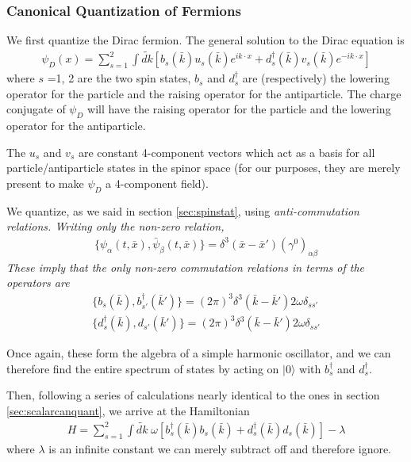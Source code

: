 \documentclass[12pt,epsf]{article}
\def\nolabel{\nonumber }
\def\nolabel{\nonumber }
\begin{document}
\subsubsection{Canonical Quantization of Fermions}

We first quantize the Dirac fermion.  The general solution to the Dirac
equation is
\begin{eqnarray}
\psi_D(x) = \sum_{s=1}^2\int \widetilde{dk} [b_s(\bar k)u_s(\bar
k)e^{ik\cdot x} + d^{\dagger}_s(\bar k)v_s(\bar k)e^{-ik\cdot
x}]\nolabel
\end{eqnarray}
where $s$ =1, 2 are the two spin states, $b_s$ and $d^{\dagger}_s$ are
(respectively) the lowering operator for the particle and the raising
operator for the antiparticle.	The charge conjugate of $\psi_D$ will
have the raising operator for the particle and the lowering operator
for the antiparticle.  

The $u_s$ and $v_s$ are constant 4-component vectors which act as a
basis for all particle/antiparticle states in the spinor space (for our
purposes, they are merely present to make $\psi_D$ a 4-component
field).  

We quantize, as we said in section \ref{sec:spinstat}, using \it
anti\rm-commutation relations.	Writing only the non-zero relation,
\begin{eqnarray}
\{\psi_{\alpha}(t,\bar x),\bar \psi_{\beta}(t,\bar x)\} = \delta^3(\bar
x - \bar x')(\gamma^0)_{\alpha \beta}\nolabel
\end{eqnarray}
These imply that the only non-zero commutation relations in terms of
the operators are 
\begin{eqnarray}
\{b_s(\bar k),b^{\dagger}_{s'}(\bar k')\} = (2\pi)^3\delta^3(\bar k -
\bar k')2\omega \delta_{s s'} \nolabel\\
\{d^{\dagger}_s(\bar k),d_{s'}(\bar k')\} = (2\pi)^3\delta^3(\bar k -
\bar k')2\omega\delta_{ss'}\nolabel
\end{eqnarray}

Once again, these form the algebra of a simple harmonic oscillator, and
we can therefore find the entire spectrum of states by acting on
$|0\rangle$ with $b^{\dagger}_s$ and $d^{\dagger}_s$.  

Then, following a series of calculations nearly identical to the ones
in section \ref{sec:scalarcanquant}, we arrive at the Hamiltonian 
\begin{eqnarray}
H = \sum_{s=1}^2 \int \widetilde{dk}\; \omega [b^{\dagger}_s(\bar k)
b_s(\bar k)+ d^{\dagger}_s(\bar k)d_s(\bar k)] - \lambda
\label{eq:fermionhamiltonian}
\end{eqnarray}
where $\lambda$ is an infinite constant we can merely subtract off and
therefore ignore.  
\end{document}
